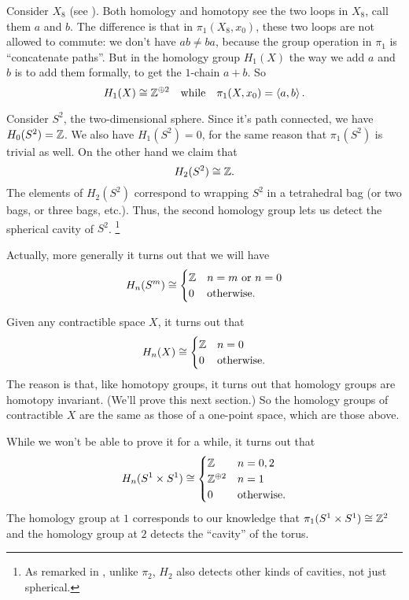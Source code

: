 \begin{example}
	Consider $X_8$ (see ).
	Both homology and homotopy see the two loops in $X_8$, call them $a$ and $b$.
	The difference is that in $\pi_1(X_8, x_0)$,
	these two loops are not allowed to commute: we don't have $ab \neq ba$,
	because the group operation in $\pi_1$ is ``concatenate paths''.
	But in the homology group $H_1(X)$ the way we add $a$ and $b$
	is to add them formally, to get the $1$-chain $a+b$.
	So \[ H_1(X) \cong \mathbb Z^{\oplus 2} \quad\text{while}\quad \pi_1(X, x_0) = \left< a,b\right>. \]
\end{example}

\begin{example}
	\label{ex:homology_group_sphere}
	Consider $S^2$, the two-dimensional sphere.
	Since it's path connected, we have $H_0(S^2) = \mathbb Z$.
	We also have $H_1(S^2) = 0$, for the same reason that $\pi_1(S^2)$ is trivial as well.
	On the other hand we claim that \[ H_2(S^2) \cong \mathbb Z. \]
	The elements of $H_2(S^2)$ correspond to wrapping $S^2$ in a tetrahedral bag
	(or two bags, or three bags, etc.).
	Thus, the second homology group lets us detect the spherical cavity of $S^2$.%
	\footnote{As remarked in , unlike $\pi_2$,
		$H_2$ also detects other kinds of cavities, not just spherical.}
\end{example}
Actually, more generally it turns out that we will have
\[
	H_n(S^m) \cong
	\begin{cases}
		\mathbb Z & n=m \text{ or } n=0 \\
		0 & \text{otherwise}.
	\end{cases}
\]

\begin{example}
	Given any contractible space $X$, it turns out that
	\[
		H_n(X)
		\cong
		\begin{cases}
			\mathbb Z & n = 0 \\
			0 & \text{otherwise}.
		\end{cases}
	\]
	The reason is that, like homotopy groups, it turns out
	that homology groups are homotopy invariant.
	(We'll prove this next section.)
	So the homology groups of contractible $X$ are the same
	as those of a one-point space, which are those above.
\end{example}

\begin{example}
	While we won't be able to prove it for a while, it turns out that
	\[
		H_n(S^1 \times S^1)
		\cong
		\begin{cases}
			\mathbb Z & n = 0,2 \\
			\mathbb Z^{\oplus 2} & n = 1 \\
			0 & \text{otherwise}.
		\end{cases}
	\]
	The homology group at $1$ corresponds to our knowledge that $\pi_1(S^1 \times S^1) \cong \mathbb Z^2$
	and the homology group at $2$ detects the ``cavity'' of the torus.
\end{example}



